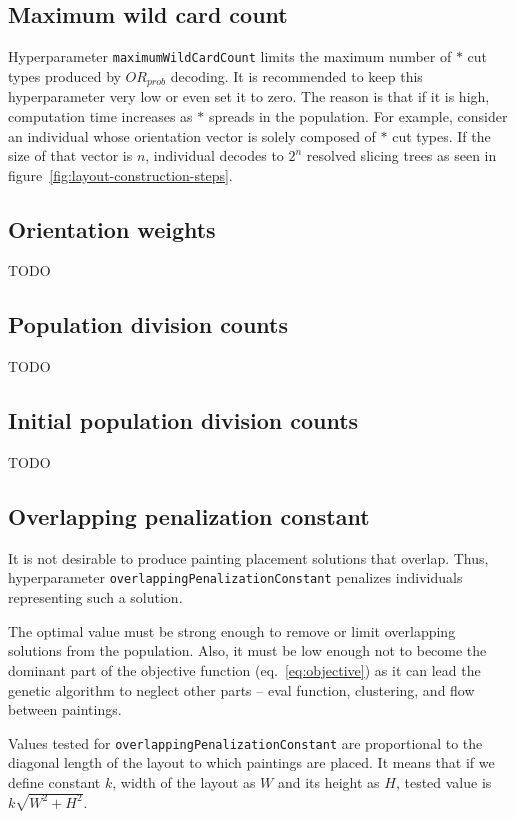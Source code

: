 \subsection{Maximum wild card count}\label{subsec:maximum-wild-card-count}
Hyperparameter \verb|maximumWildCardCount| limits the maximum number of $*$ cut types produced by $OR_{prob}$ decoding.
It is recommended to keep this hyperparameter very low or even set it to zero.
The reason is that if it is high, computation time increases as $*$ spreads in the population.
For example, consider an individual whose orientation vector is solely composed of $*$ cut types.
If the size of that vector is $n$, individual decodes to $2^n$ resolved slicing trees as seen in figure~\ref{fig:layout-construction-steps}.

\subsection{Orientation weights}\label{subsec:orientation-weights}
TODO

\subsection{Population division counts}\label{subsec:population-division-counts}
TODO

\subsection{Initial population division counts}\label{subsec:initial-population-division-counts}
TODO

\subsection{Overlapping penalization constant}\label{subsec:overlapping-penalization-constant}

It is not desirable to produce painting placement solutions that overlap.
Thus, hyperparameter \verb|overlappingPenalizationConstant| penalizes
individuals representing such a solution.

The optimal value must be strong enough to remove or limit overlapping solutions from the population.
Also, it must be low enough not to become the dominant part of the objective function (eq.~\ref{eq:objective})
as it can lead the genetic algorithm to neglect other parts – eval function, clustering, and flow between paintings.

Values tested for \verb|overlappingPenalizationConstant| are proportional to the diagonal
length of the layout to which paintings are placed.
It means that if we define constant $k$, width of the layout as $W$ and its height as $H$,
tested value is $k\sqrt{W^2 + H^2}$.

